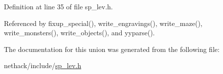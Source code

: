 Definition at line 35 of file sp\+\_\+lev.\+h.



Referenced by fixup\+\_\+special(), write\+\_\+engravings(), write\+\_\+maze(), write\+\_\+monsters(), write\+\_\+objects(), and yyparse().



The documentation for this union was generated from the following file\+:\begin{DoxyCompactItemize}
\item 
nethack/include/\hyperlink{sp__lev_8h}{sp\+\_\+lev.\+h}\end{DoxyCompactItemize}

